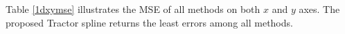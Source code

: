 Table \ref{1dxymse} illustrates the MSE of all methods on both $x$ and $y$ axes. The proposed Tractor spline returns the least errors among all methods.
